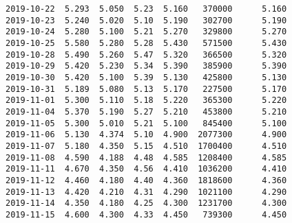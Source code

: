 \documentclass[11pt]{article}
\begin{document}
\begin{Verbatim}[commandchars=\\\{\}]
2019-10-22  5.293  5.050  5.23  5.160   370000      5.160
2019-10-23  5.240  5.020  5.10  5.190   302700      5.190
2019-10-24  5.280  5.100  5.21  5.270   329800      5.270
2019-10-25  5.580  5.280  5.28  5.430   571500      5.430
2019-10-28  5.490  5.260  5.47  5.320   366500      5.320
2019-10-29  5.420  5.230  5.34  5.390   385900      5.390
2019-10-30  5.420  5.100  5.39  5.130   425800      5.130
2019-10-31  5.189  5.080  5.13  5.170   227500      5.170
2019-11-01  5.300  5.110  5.18  5.220   365300      5.220
2019-11-04  5.370  5.190  5.27  5.210   453800      5.210
2019-11-05  5.300  5.010  5.21  5.100   845400      5.100
2019-11-06  5.130  4.374  5.10  4.900  2077300      4.900
2019-11-07  5.180  4.350  5.15  4.510  1700400      4.510
2019-11-08  4.590  4.188  4.48  4.585  1208400      4.585
2019-11-11  4.670  4.350  4.56  4.410  1036200      4.410
2019-11-12  4.460  4.180  4.40  4.360  1818600      4.360
2019-11-13  4.420  4.210  4.31  4.290  1021100      4.290
2019-11-14  4.350  4.180  4.25  4.300  1231700      4.300
2019-11-15  4.600  4.300  4.33  4.450   739300      4.450


\end{Verbatim}
\end{document}
